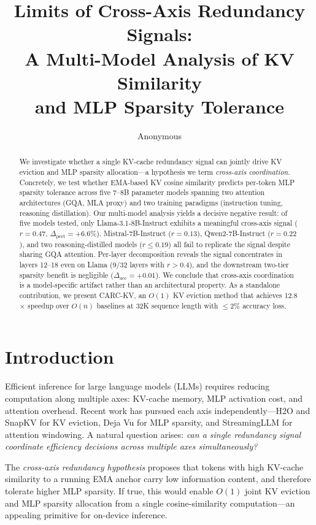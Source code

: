 \documentclass[11pt]{article}
\title{Limits of Cross-Axis Redundancy Signals:\\A Multi-Model Analysis of KV Similarity\\and MLP Sparsity Tolerance}
\author{Anonymous}
\date{}
\begin{document}
\maketitle

\begin{abstract}
We investigate whether a single KV-cache redundancy signal can jointly drive KV eviction and MLP sparsity allocation---a hypothesis we term \emph{cross-axis coordination}. Concretely, we test whether EMA-based KV cosine similarity predicts per-token MLP sparsity tolerance across five 7--8B parameter models spanning two attention architectures (GQA, MLA proxy) and two training paradigms (instruction tuning, reasoning distillation). Our multi-model analysis yields a decisive negative result: of five models tested, only Llama-3.1-8B-Instruct exhibits a meaningful cross-axis signal ($r{=}0.47$, $\Delta_\text{pert}{=}{+}6.6\%$). Mistral-7B-Instruct ($r{=}0.13$), Qwen2-7B-Instruct ($r{=}0.22$), and two reasoning-distilled models ($r{\leq}0.19$) all fail to replicate the signal despite sharing GQA attention. Per-layer decomposition reveals the signal concentrates in layers 12--18 even on Llama (9/32 layers with $r{>}0.4$), and the downstream two-tier sparsity benefit is negligible ($\Delta_\text{acc}{=}{+}0.01$). We conclude that cross-axis coordination is a model-specific artifact rather than an architectural property. As a standalone contribution, we present CARC-KV, an $O(1)$ KV eviction method that achieves 12.8$\times$ speedup over $O(n)$ baselines at 32K sequence length with ${\leq}2\%$ accuracy loss.
\end{abstract}

\section{Introduction}

Efficient inference for large language models (LLMs) requires reducing computation along multiple axes: KV-cache memory, MLP activation cost, and attention overhead. Recent work has pursued each axis independently---H2O \citep{zhang2023h2o} and SnapKV \citep{li2024snapkv} for KV eviction, Deja Vu \citep{liu2023dejavu} for MLP sparsity, and StreamingLLM \citep{xiao2024streamingllm} for attention windowing. A natural question arises: \emph{can a single redundancy signal coordinate efficiency decisions across multiple axes simultaneously?}

The \emph{cross-axis redundancy hypothesis} proposes that tokens with high KV-cache similarity to a running EMA anchor carry low information content, and therefore tolerate higher MLP sparsity. If true, this would enable $O(1)$ joint KV eviction and MLP sparsity allocation from a single cosine-similarity computation---an appealing primitive for on-device inference.
\end{document}
